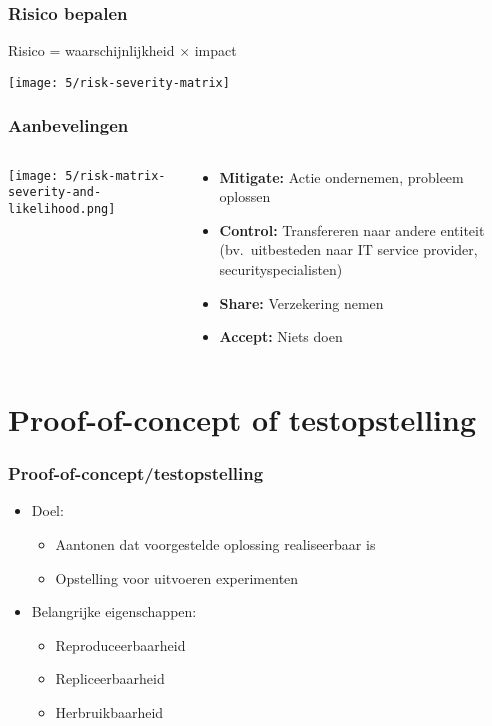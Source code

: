 \documentclass[aspectratio=169]{beamer}
\begin{document}
\begin{frame}
  \frametitle{Risico bepalen}

  \centering
  
  Risico = waarschijnlijkheid $\times$ impact

  \texttt{[image: 5/risk-severity-matrix]}

\end{frame}

\begin{frame}
  \frametitle{Aanbevelingen}

  \begin{columns}
    \begin{column}{.5\textwidth}
      \texttt{[image: 5/risk-matrix-severity-and-likelihood.png]}
    \end{column}

    \begin{column}{.5\textwidth}
      \begin{itemize}
        \item \textbf{Mitigate:} Actie ondernemen, probleem oplossen
        \item \textbf{Control:} Transfereren naar andere entiteit (bv.\ uitbesteden naar IT service provider, securityspecialisten)
        \item \textbf{Share:} Verzekering nemen
        \item \textbf{Accept:} Niets doen
      \end{itemize}
    \end{column}
  \end{columns}

\end{frame}

\section{Proof-of-concept of testopstelling}

\begin{frame}
  \frametitle{Proof-of-concept/testopstelling}

  \begin{itemize}
    \item Doel:
      \begin{itemize}
        \item Aantonen dat voorgestelde oplossing realiseerbaar is
        \item Opstelling voor uitvoeren experimenten
      \end{itemize}
    \item Belangrijke eigenschappen:
      \begin{itemize}
        \item Reproduceerbaarheid
        \item Repliceerbaarheid
        \item Herbruikbaarheid
      \end{itemize} 
  \end{itemize}

\end{frame}
\end{document}
